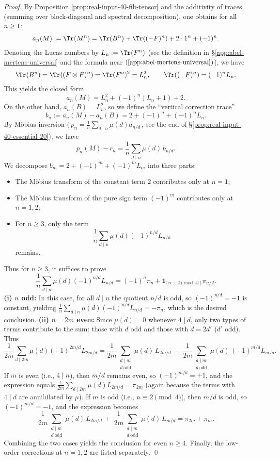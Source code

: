 \begin{proof}
By Proposition \ref{prop:real-input-40-fib-tensor} and the additivity of traces (summing over block-diagonal and spectral decomposition), one obtains for all \(n\ge 1\):
\[
a_n(M):=\Tr(M^n)
=\Tr(B^n)+\Tr((-F)^n)+2\cdot 1^n+(-1)^n.
\]
Denoting the Lucas numbers by \(L_n:=\Tr(F^n)\) (see the definition in \S\ref{app:abel-mertens-universal} and the formula near \((\ref{app:abel-mertens-universal})\)), we have
\[
\Tr(B^n)=\Tr((F\otimes F)^n)=\Tr(F^n)^2=L_n^2,
\qquad
\Tr((-F)^n)=(-1)^n L_n.
\]
This yields the closed form
\[
a_n(M)=L_n^2+(-1)^n(L_n+1)+2.
\]
On the other hand, \(a_n(B)=L_n^2\), so we define the ``vertical correction trace''
\[
b_n:=a_n(M)-a_n(B)=2+(-1)^n+(-1)^nL_n.
\]
By M\"obius inversion (\(\,p_n=\frac1n\sum_{d\mid n}\mu(d)a_{n/d}\,\), see the end of \S\ref{prop:real-input-40-essential-20}), we have
\[
p_n(M)-r_n=\frac{1}{n}\sum_{d\mid n}\mu(d)\,b_{n/d}.
\]
We decompose \(b_m=2+(-1)^m+(-1)^mL_m\) into three parts:
\begin{itemize}
  \item The M\"obius transform of the constant term \(2\) contributes only at \(n=1\);
  \item The M\"obius transform of the pure sign term \((-1)^m\) contributes only at \(n=1,2\);
  \item For \(n\ge 3\), only the term
  \[
  \frac{1}{n}\sum_{d\mid n}\mu(d)(-1)^{n/d}L_{n/d}
  \]
  remains.
\end{itemize}
Thus for \(n\ge 3\), it suffices to prove
\[
\frac{1}{n}\sum_{d\mid n}\mu(d)(-1)^{n/d}L_{n/d}
=(-1)^n\pi_n+\mathbf{1}_{\{n\equiv 2\!\!\pmod 4\}}\pi_{n/2}.
\]
\textbf{(i) \(n\) odd:} In this case, for all \(d\mid n\) the quotient \(n/d\) is odd, so \((-1)^{n/d}=-1\) is constant, yielding
\(
\frac{1}{n}\sum_{d\mid n}\mu(d)(-1)^{n/d}L_{n/d}=-\pi_n
\), which is the desired conclusion.
\textbf{(ii) \(n=2m\) even:} Since \(\mu(d)=0\) whenever \(4\mid d\), only two types of terms contribute to the sum: those with \(d\) odd and those with \(d=2d'\) (\(d'\) odd). Thus
\[
\frac{1}{2m}\sum_{d\mid 2m}\mu(d)(-1)^{2m/d}L_{2m/d}
=\frac{1}{2m}\sum_{\substack{d\mid m\\ d\ \mathrm{odd}}}\mu(d)\,L_{2m/d}
\ -\ \frac{1}{2m}\sum_{\substack{d\mid m\\ d\ \mathrm{odd}}}\mu(d)\,(-1)^{m/d}L_{m/d}.
\]
If \(m\) is even (i.e., \(4\mid n\)), then \(m/d\) remains even, so \((-1)^{m/d}=+1\), and the expression equals
\(
\frac{1}{2m}\sum_{d\mid 2m}\mu(d)L_{2m/d}=\pi_{2m}
\)
(again because the terms with \(4\mid d\) are annihilated by \(\mu\)). If \(m\) is odd (i.e., \(n\equiv 2\pmod 4\)), then \(m/d\) is odd, so \((-1)^{m/d}=-1\), and the expression becomes
\[
\frac{1}{2m}\sum_{\substack{d\mid m\\ d\ \mathrm{odd}}}\mu(d)\,L_{2m/d}
\ +\ \frac{1}{2m}\sum_{\substack{d\mid m\\ d\ \mathrm{odd}}}\mu(d)\,L_{m/d}
=\pi_{2m}+\pi_m.
\]
Combining the two cases yields the conclusion for even \(n\ge 4\). Finally, the low-order corrections at \(n=1,2\) are listed separately. \qed
\end{proof}
